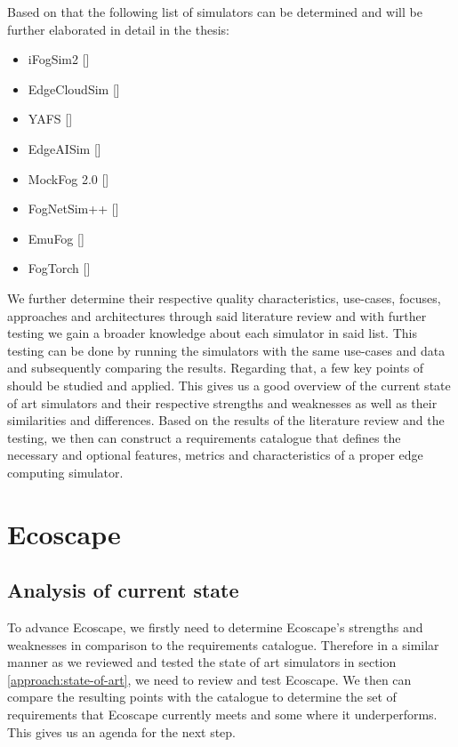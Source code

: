 Based on that the following list of simulators can be determined and will be further elaborated in detail in the thesis:
\begin{itemize}
  \item iFogSim2 [\cite{mahmud2021ifogsim2extendedifogsimsimulator}]
  \item EdgeCloudSim [\cite{https://doi.org/10.1002/ett.3493}]
  \item YAFS [\cite{8758823}]
  \item EdgeAISim [\cite{Nandhakumar_2024}]
  \item MockFog 2.0 [\cite{Hasenburg_2023}]
  \item FogNetSim++ [\cite{fognetsimplspls}]
  \item EmuFog [\cite{8368525}]
  \item FogTorch [\cite{7919155}]
\end{itemize}
We further determine their respective quality characteristics, use-cases, focuses, approaches and architectures through said literature review and with further testing we gain a broader knowledge about each simulator in said list.
This testing can be done by running the simulators with the same use-cases and data and subsequently comparing the results. Regarding that, a few key points of \cite{pfandzelter2024lessonslearnedbuildingedge} should be studied and applied.
This gives us a good overview of the current state of art simulators and their respective strengths and weaknesses as well as their similarities and differences.
Based on the results of the literature review and the testing, we then can construct a requirements catalogue that defines the necessary and optional features, metrics and characteristics of a proper edge computing simulator.

\section{Ecoscape}\label{approach:ecoscape}
\subsection{Analysis of current state}\label{approach:ecoscape-current-state}
To advance Ecoscape, we firstly need to determine Ecoscape's strengths and weaknesses in comparison to the requirements catalogue. 
Therefore in a similar manner as we reviewed and tested the state of art simulators in section \ref{approach:state-of-art}, we need to review and test Ecoscape.
We then can compare the resulting points with the catalogue to determine the set of requirements that Ecoscape currently meets and some where it underperforms.
This gives us an agenda for the next step.

